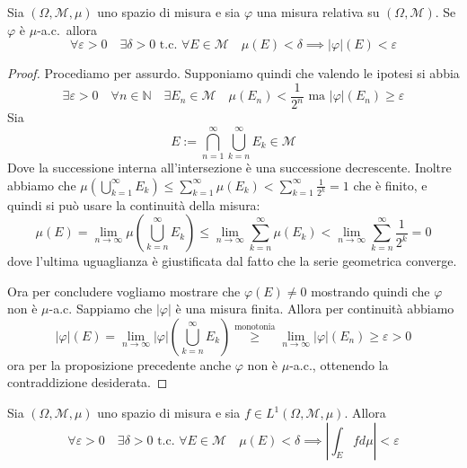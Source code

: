 \begin{proposition}
    Sia \((\Omega, \mathcal{M}, \mu)\) uno spazio di misura e sia \(\varphi \)
    una misura relativa su \((\Omega, \mathcal{M})\). Se \(\varphi \) è
    \(\mu\)-a.c.~allora 
    \[
        \forall \varepsilon>0 \quad \exists \delta >0 \text{ t.c. } \forall E
        \in \mathcal{M} \quad \mu(E) <\delta \implies |\varphi |(E) < \varepsilon
    \]
\end{proposition}
\begin{proof}
    Procediamo per assurdo. Supponiamo quindi che valendo le ipotesi si abbia
    \[
        \exists \varepsilon >0 \quad \forall n \in \mathbb{N} \quad \exists E_{n} \in
        \mathcal{M} \quad \mu(E_n) < \frac{1}{2^{n}} \text{ ma } |\varphi|(E_n) \ge
        \varepsilon
    \]
    Sia 
    \[
        E := \bigcap_{n=1}^{\infty} \bigcup_{k=n}^{\infty} E_k \in \mathcal{M} 
    \]
    Dove la successione interna all'intersezione è una successione decrescente.
    Inoltre abbiamo che \(\mu{\left( \bigcup_{k=1}^{\infty}E_k  \right)}\le
    \sum_{k=1}^{\infty} \mu(E_k) < \sum_{k=1}^{\infty} \frac{1}{2^{k}} = 1\) che è
    finito, e quindi si può usare la continuità della misura:
    \[
        \mu(E) = \lim_{n \to \infty} \mu\left( \bigcup_{k=n}^{\infty} E_k
        \right) \le \lim_{n \to \infty} \sum_{k=n}^{\infty} \mu(E_k) < \lim_{n
        \to \infty} \sum_{k=n}^{\infty} \frac{1}{2^{k}} = 0 
    \]
    dove l'ultima uguaglianza è giustificata dal fatto che la serie geometrica
    converge. 

    Ora per concludere vogliamo mostrare che \(\varphi (E) \neq 0\) mostrando
    quindi che \(\varphi \) non è \(\mu\)-a.c. Sappiamo che \(|\varphi |\) è una
    misura finita. Allora per continuità abbiamo
    \[
        |\varphi |(E) = \lim_{n \to \infty} |\varphi |{\left(
        \bigcup_{k=n}^{\infty}E_k  \right)} \overset{\text{monotonia}}{\ge}
        \lim_{n \to \infty} |\varphi |(E_n) \ge \varepsilon >0
    \]
    ora per la proposizione precedente anche \(\varphi \) non è \(\mu\)-a.c.,
    ottenendo la contraddizione desiderata.
\end{proof}
\begin{corollary}
    Sia \((\Omega, \mathcal{M}, \mu)\) uno spazio di misura e sia \(f \in
    L^{1}(\Omega, \mathcal{M}, \mu)\). Allora 
    \[
        \forall \varepsilon > 0 \quad \exists \delta > 0 \text{ t.c. } \forall E
        \in \mathcal{M} \quad \mu(E) < \delta \implies \left|\int_{E} f
        d\mu\right| < \varepsilon
    \]
\end{corollary}
